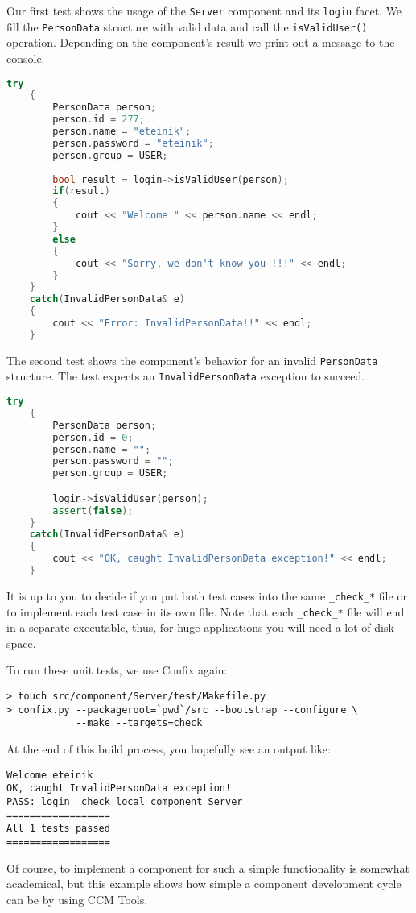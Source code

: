 \vspace{3mm}
Our first test shows the usage of the {\tt Server} component and its {\tt login}
facet. We fill the {\tt PersonData} structure with valid data and call the
{\tt isValidUser()} operation. Depending on the component's result we print out
a message to the console.

\begin{footnotesize}
\begin{lstlisting}[language=C++]
    try 
    {
        PersonData person;
        person.id = 277;
        person.name = "eteinik";
        person.password = "eteinik";
        person.group = USER;
	
        bool result = login->isValidUser(person);
        if(result) 
        {
            cout << "Welcome " << person.name << endl;
        }
        else 
        {
            cout << "Sorry, we don't know you !!!" << endl;
        }
    }
    catch(InvalidPersonData& e) 
    {
        cout << "Error: InvalidPersonData!!" << endl;
    }
\end{lstlisting}
\end{footnotesize}


The second test shows the component's behavior for an invalid {\tt PersonData}
structure. The test expects an {\tt InvalidPersonData} exception to succeed.

\begin{footnotesize}
\begin{lstlisting}[language=C++]
    try 
    {
        PersonData person;
        person.id = 0;
        person.name = "";
        person.password = "";
        person.group = USER;

        login->isValidUser(person);
        assert(false);
    }
    catch(InvalidPersonData& e) 
    {
        cout << "OK, caught InvalidPersonData exception!" << endl;
    }
\end{lstlisting}
\end{footnotesize}

It is up to you to decide if you put both test cases into the same {\tt \_check\_*}
file or to implement each test case in its own file.
Note that each {\tt \_check\_*} file will end in a separate executable, thus,
for huge applications you will need a lot of disk space.

To run these unit tests, we use Confix again:
\begin{verbatim}
> touch src/component/Server/test/Makefile.py
> confix.py --packageroot=`pwd`/src --bootstrap --configure \
            --make --targets=check 
\end{verbatim}

At the end of this build process, you hopefully see an output like:
\begin{verbatim}
Welcome eteinik
OK, caught InvalidPersonData exception!
PASS: login__check_local_component_Server
==================
All 1 tests passed
==================
\end{verbatim}

Of course, to implement a component for such a simple functionality is somewhat
academical, but this example shows how simple a component development cycle can
be by using CCM Tools. 


\newpage
